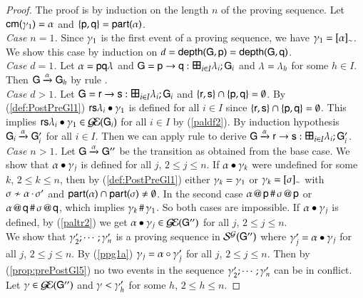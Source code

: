 \begin{proof} 
The proof is by induction on the length $n$ of the proving sequence. Let $\comm{\comocc_1}=\alpha$ and $\set{\pp,\q}=\participant\alpha$.\\
 {\it Case $n=1$.}   Since $\globev_1$ is the
first event of a proving sequence, we have $\globev_1 =\eqclass{\alpha}$. We show this case by induction on $d=\weight(\G,\pp)=\weight(\G,\q)$.\\
{\it Case $d=1$.} Let $\alpha = \Comm\pp\la\q$ and $\G=\gt\pp\q i I \la \G$ and $\la=\la_h$ for some $h\in I$. Then $\G\stackred\alpha\G_h$ by rule .\\
{\it Case $d>1$.} Let  $\G= \gt\pr\ps i I \la \G$ and $\set{\pr,\ps}\cap\set{\pp,\q}=\emptyset$. By (\ref{def:PostPreGl1})  $\postG{\comocc_1}{\Comm\pr{\la_i}\ps}$
is defined for all $i\in I$ since $\set{\pr,\ps}\cap\set{\pp,\q}=\emptyset$. This implies $\postG{\comocc_1}{\Comm\pr{\la_i}\ps}\in\EGG(\G_i)$  for all $i\in I$ by (\ref{paldf2}).
By induction hypothesis $\G_i\stackred\alpha\G'_i$ for all $i\in I$. Then we can apply rule   to derive $\G\stackred\alpha\gtp\pr\ps i I \la \G$.\\
{\it Case $n>1$.}    
Let $\G\stackred\alpha\G''$
be the transition as obtained from the base case. 
We show that $\postG{\comocc_j}{\alpha}$ is defined for all $j$, $2\leq j\leq n$. 
If $\postG{\comocc_k}{\alpha}$ were undefined
for some $k$, $2\leq k\leq n$, then by
(\ref{def:PostPreGl1}) either
$\comocc_k=\comocc_1$ or $\comocc_k=\eqclass\comseq$ with
$\comseq\not\sim\concat\alpha{\comseq'}$ and
$\participant\alpha\cap\participant\comseq\not=\emptyset$. In the second case
$\pro\alpha{\pp}\grr\pro\comseq{\pp}$ or $\pro\alpha{\q}\grr\pro\comseq{\q}$, which
implies $\comocc_k\grr\comocc_1$.  So both cases are impossible.  If
$\postG{\comocc_j}{\alpha}$ is defined, by
(\ref{paltr2}) we get $
\postG{\comocc_j}{\alpha}\in\EGG(\G'')$ for all $j$,
$2\leq j\leq n$.\\
 We show that $\comocc'_2 ;\cdots ;\comocc'_n$ is a
proving sequence in $\ESG{\G''}$ where $\comocc'_j =
\postG{\comocc_j}{\alpha}$ for all $j$,
$2\leq j\leq n$.
By (\ref{ppg1a}) $\comocc_j =
\preG{\comocc'_j}{\alpha}$ for all $j$, $2\leq j\leq n$. 
Then by
(\ref{prop:prePostGl5}) no two
events in  the sequence $\comocc'_2 ;\cdots ;\comocc'_n$  can be in conflict. 
Let $\comocc\in\EGG(\G'')$ and $\comocc< \comocc'_h$
for some $h$, $2\leq h\leq n$.  

\end{proof}
